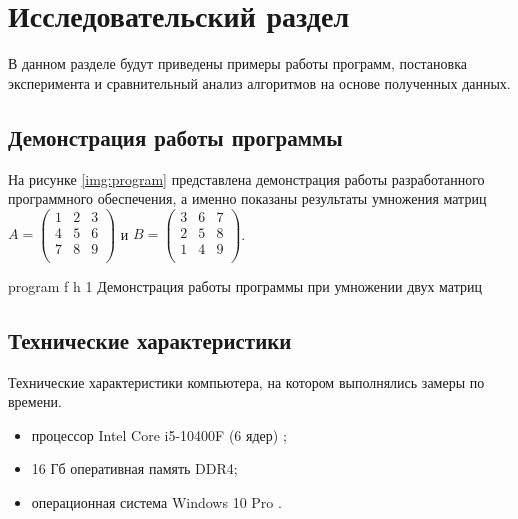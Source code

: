 \chapter{Исследовательский раздел}

В данном разделе будут приведены примеры работы программ, постановка эксперимента и сравнительный анализ алгоритмов на основе полученных данных.

\section{Демонстрация работы программы}


На рисунке \ref{img:program} представлена демонстрация работы разработанного программного обеспечения, а именно показаны результаты умножения матриц $A = \begin{pmatrix}
	1 & 2 & 3\\
	4 & 5 & 6 \\
	7 & 8 & 9\\
\end{pmatrix}$ и $B = \begin{pmatrix}
	3 & 6 & 7\\
	2 & 5 & 8 \\
	1 & 4 & 9 \\
\end{pmatrix}$.  
\clearpage

{program} %
{f} %
{h} %
{1\textwidth} %
{Демонстрация работы программы при умножении двух матриц} %

\clearpage


\section{Технические характеристики}

Технические характеристики компьютера, на котором выполнялись замеры по времени.

\begin{itemize}
	\item процессор Intel Core i5-10400F (6 ядер) \cite{intel};
	\item 16 Гб оперативная память DDR4;
	\item операционная система Windows 10 Pro \cite{windows}.
\end{itemize}

